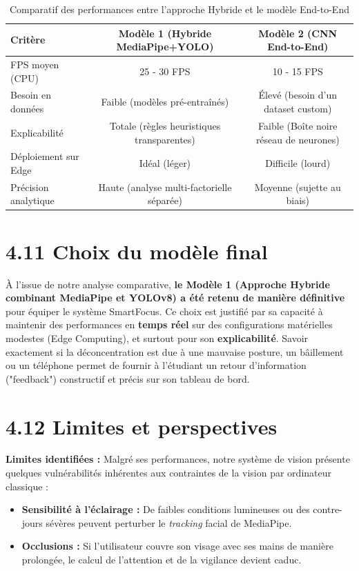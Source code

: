 \begin{table}[H]
    \centering
    \begin{tabular}{|l|c|c|}
        \hline
        \textbf{Critère} & \textbf{Modèle 1 (Hybride MediaPipe+YOLO)} & \textbf{Modèle 2 (CNN End-to-End)} \\
        \hline
        FPS moyen (CPU) & 25 - 30 FPS & 10 - 15 FPS \\
        Besoin en données & Faible (modèles pré-entraînés) & Élevé (besoin d'un dataset custom) \\
        Explicabilité & Totale (règles heuristiques transparentes) & Faible (Boîte noire réseau de neurones) \\
        Déploiement sur Edge & Idéal (léger) & Difficile (lourd) \\
        Précision analytique & Haute (analyse multi-factorielle séparée) & Moyenne (sujette au biais) \\
        \hline
    \end{tabular}
    \caption{Comparatif des performances entre l'approche Hybride et le modèle End-to-End}
    \label{tab:comparaison_modeles}
\end{table}


\section{4.11 Choix du modèle final}
À l'issue de notre analyse comparative, \textbf{le Modèle 1 (Approche Hybride combinant MediaPipe et YOLOv8) a été retenu de manière définitive} pour équiper le système SmartFocus. Ce choix est justifié par sa capacité à maintenir des performances en \textbf{temps réel} sur des configurations matérielles modestes (Edge Computing), et surtout pour son \textbf{explicabilité}. Savoir exactement si la déconcentration est due à une mauvaise posture, un bâillement ou un téléphone permet de fournir à l'étudiant un retour d'information ("feedback") constructif et précis sur son tableau de bord.


\section{4.12 Limites et perspectives}

\textbf{Limites identifiées :}
Malgré ses performances, notre système de vision présente quelques vulnérabilités inhérentes aux contraintes de la vision par ordinateur classique :
\begin{itemize}
    \item \textbf{Sensibilité à l’éclairage :} De faibles conditions lumineuses ou des contre-jours sévères peuvent perturber le \textit{tracking} facial de MediaPipe.
    \item \textbf{Occlusions :} Si l'utilisateur couvre son visage avec ses mains de manière prolongée, le calcul de l'attention et de la vigilance devient caduc.
\end{itemize}

